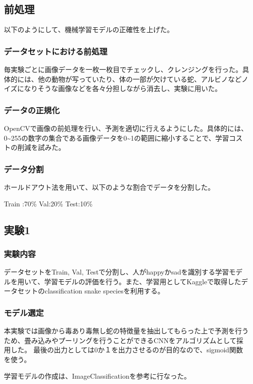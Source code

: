 \documentclass[a4paper, 11pt, titlepage]{jsarticle}
\begin{document}
\clearpage

\subsection{前処理}
以下のようにして、機械学習モデルの正確性を上げた。

\subsubsection{データセットにおける前処理}
毎実験ごとに画像データを一枚一枚目でチェックし、クレンジングを行った。具体的には、他の動物が写っていたり、体の一部が欠けている蛇、アルビノなどノイズになりそうな画像などを各々分担しながら消去し、実験に用いた。

\subsubsection{データの正規化}
OpenCVで画像の前処理を行い、予測を適切に行えるようにした。具体的には、0\textasciitilde255の数字の集合である画像データを0\textasciitilde1の範囲に縮小することで、学習コストの削減を試みた。

\subsubsection{データ分割}
ホールドアウト法を用いて、以下のような割合でデータを分割した。\par
Train :70\%
Val:20\%
Test:10\%


\subsection{実験1}
\subsubsection{実験内容}
データセットをTrain, Val, Testで分割し、人がhappyかsadを識別する学習モデルを用いて、学習モデルの評価を行う。また、学習用としてKaggleで取得したデータセットのclassification snake speciesを利用する。\par

\subsubsection{モデル選定}
本実験では画像から毒あり毒無し蛇の特徴量を抽出してもらった上で予測を行うため、畳み込みやプーリングを行うことができるCNNをアルゴリズムとして採用した。
最後の出力としては0か１を出力させるのが目的なので、sigmoid関数を使う。\par
学習モデルの作成は、ImageClassification\cite{theme3}を参考に行なった。\par
\end{document}
